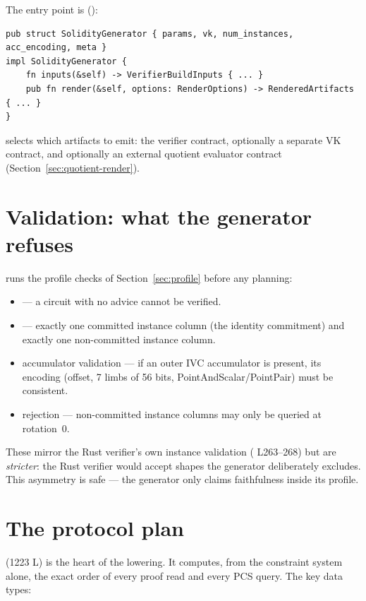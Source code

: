 The entry point is  ():
\begin{lstlisting}[style=rust]
pub struct SolidityGenerator { params, vk, num_instances, acc_encoding, meta }
impl SolidityGenerator {
    fn inputs(&self) -> VerifierBuildInputs { ... }
    pub fn render(&self, options: RenderOptions) -> RenderedArtifacts { ... }
}
\end{lstlisting}
 selects which artifacts to emit: the verifier contract,
optionally a separate VK contract, and optionally an external quotient
evaluator contract (Section~\ref{sec:quotient-render}).

\section{Validation: what the generator refuses}
\label{sec:validation}

 runs the profile checks of
Section~\ref{sec:profile} before any planning:
\begin{itemize}[leftmargin=1.4em,itemsep=1pt]
  \item {} --- a circuit with no advice cannot be verified.
  \item {} --- exactly one committed
        instance column (the identity commitment) and exactly one
        non-committed instance column.
  \item accumulator validation --- if an outer IVC accumulator is present,
        its encoding (offset, 7 limbs of 56 bits, PointAndScalar/PointPair)
        must be consistent.
  \item {} rejection --- non-committed instance
        columns may only be queried at rotation~0.
\end{itemize}
These mirror the Rust verifier's own instance validation
( L263--268) but are \emph{stricter}: the Rust verifier
would accept shapes the generator deliberately excludes. This asymmetry is
safe --- the generator only claims faithfulness inside its profile.

\section{The protocol plan}
\label{sec:protocol-plan}

(1223 L) is the heart of the lowering. It computes, from the constraint
system alone, the exact order of every proof read and every PCS query. The
key data types:

